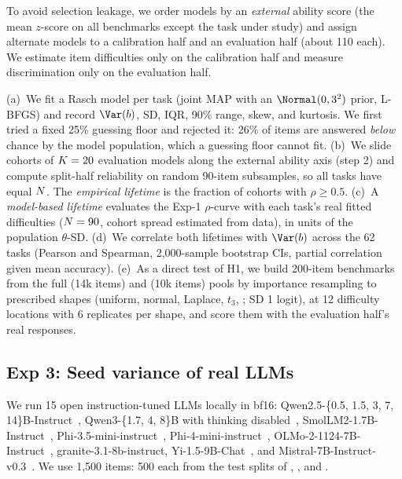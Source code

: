  To avoid selection leakage, we order models by an {\em external} ability score (the mean $z$-score on all benchmarks except the task under study) and assign alternate models to a calibration half and an evaluation half (about 110 each). We estimate item difficulties only on the calibration half and measure discrimination only on the evaluation half.

 (a)~We fit a Rasch model per task (joint MAP with an $\Normal(0, 3^2)$ prior, L-BFGS) and record $\Var(b)$, SD, IQR, 90\% range, skew, and kurtosis. We first tried a fixed 25\% guessing floor and rejected it: 26\% of \arcc items are answered {\em below} chance by the model population, which a guessing floor cannot fit. (b)~We slide cohorts of $K = 20$ evaluation models along the external ability axis (step 2) and compute split-half reliability on random 90-item subsamples, so all tasks have equal $N$. The {\em empirical lifetime} is the fraction of cohorts with $\rho \ge 0.5$. (c)~A {\em model-based lifetime} evaluates the Exp-1 $\rho$-curve with each task's real fitted difficulties ($N = 90$, cohort spread estimated from data), in units of the population $\theta$-SD. (d)~We correlate both lifetimes with $\Var(b)$ across the 62 tasks (Pearson and Spearman, 2{,}000-sample bootstrap CIs, partial correlation given mean accuracy). (e)~As a direct test of H1, we build 200-item benchmarks from the full \mmlu (14k items) and \hellaswag (10k items) pools by importance resampling to prescribed shapes (uniform, normal, Laplace, $t_3$, \lnhard; SD 1 logit), at 12 difficulty locations with 6 replicates per shape, and score them with the evaluation half's real responses.

\subsection{Exp 3: Seed variance of real LLMs}
\label{sec:exp3}

 We run 15 open instruction-tuned LLMs locally in bf16: Qwen2.5-\{0.5, 1.5, 3, 7, 14\}B-Instruct~\citep{qwen2024qwen25}, Qwen3-\{1.7, 4, 8\}B with thinking disabled~\citep{yang2025qwen3}, SmolLM2-1.7B-Instruct~\citep{allal2025smollm2}, Phi-3.5-mini-instruct~\citep{abdin2024phi3}, Phi-4-mini-instruct~\citep{microsoft2025phi4mini}, OLMo-2-1124-7B-Instruct~\citep{olmo2024olmo2}, granite-3.1-8b-instruct, Yi-1.5-9B-Chat~\citep{young2024yi}, and Mistral-7B-Instruct-v0.3~\citep{jiang2023mistral}. We use 1{,}500 items: 500 each from the test splits of \arce, \arcc, and \mmlu.

